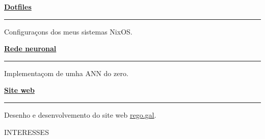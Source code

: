\documentclass [a4paper] {extarticle} %
\newcommand{\sectionlinethickness} {0.5pt}
\newcommand{\leftcolumwidth} {0.15}
\newcommand{\rightcolumwidth}{0.84}
\newcommand {\sectiontitle}[1] {
  \vspace*{-10pt}
  \begin {flushleft}
  \begin {minipage}[c]{\leftcolumwidth\textwidth}
    \begin {flushright}
      \!\MakeUppercase {#1}
      \hspace* {10pt}
    \end {flushright}
  \end {minipage}
  \begin{minipage}[c]{\rightcolumwidth\textwidth}
    \begin {tikzpicture}[remember picture, overlay,blend mode=multiply]
      \draw [line width=\sectionlinethickness, black] (0,0) -- (15,0);
    \end {tikzpicture}
  \end{minipage}
  \end {flushleft}
}
\begin{document}
\begin {flushright}
\begin {minipage} [t] {\rightcolumwidth\textwidth}
  \begin {minipage} [t] {0.3\textwidth}
    \begin{minipage}[c]{100pt}
      \href {https://github.com/yref-boop/dotfiles} {\textbf {Dotfiles}}
    \end{minipage}
      \hfill
    \begin{minipage}[c]{8pt}
    \end{minipage}
    \vspace{1pt}
    \hrule
    \vspace {4pt} Configuraçons dos meus sistemas NixOS.
  \end {minipage}
  \hfill
  \begin {minipage} [t] {0.3\textwidth}
    \begin{minipage}[c]{100pt}
      \href {https://github.com/yref-boop/ann} {\textbf {Rede neuronal}}
    \end{minipage}
    \hfill
    \begin{minipage}[c]{9pt}
      \vspace{1pt}
    \end{minipage}
    \vspace{1pt}
    \hrule
    \vspace {4pt} Implementaçom de umha ANN do zero.
  \end {minipage}
  \hfill
  \begin {minipage} [t] {0.3\textwidth}
    \begin{minipage}[c]{100pt}
      \href {https://github.com/yref-boop/ann} {\textbf {Site web}}
    \end{minipage}
    \hfill
    \begin{minipage}[c]{9pt}
      \vspace{1pt}
    \end{minipage}
    \vspace{1pt}
    \hrule
    \vspace {4pt} Desenho e desenvolvemento do site web \href{rego.gal}{\underline{rego.gal}}.
  \end {minipage}
\end {minipage}
\end {flushright}


\sectiontitle {Interesses}
\vspace{-15pt}
\end{document}
